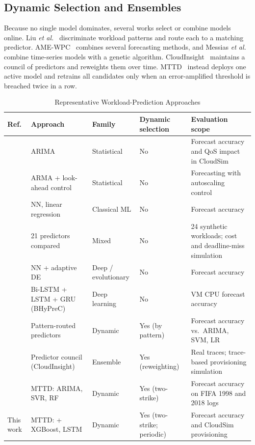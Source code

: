 \documentclass[journal,onecolumn,11pt]{IEEEtran}
\begin{document}
\subsection{Dynamic Selection and Ensembles}
Because no single model dominates, several works select or combine models online. Liu \emph{et al.}~\cite{liu2017} discriminate workload patterns and route each to a matching predictor. AME-WPC~\cite{cetinski2015} combines several forecasting methods, and Messias \emph{et al.}~\cite{messias2016} combine time-series models with a genetic algorithm. CloudInsight~\cite{kim2022} maintains a council of predictors and reweights them over time. MTTD~\cite{nashaat2026} instead deploys one active model and retrains all candidates only when an error-amplified threshold is breached twice in a row.

\begin{table}[H]
\centering
\caption{Representative Workload-Prediction Approaches}
\label{tab:related}
\footnotesize
\begin{tabularx}{\linewidth}{@{}l L l l L@{}}
\toprule
Ref. & Approach & Family & Dynamic selection & Evaluation scope\\
\midrule
\cite{calheiros2015} & ARIMA & Statistical & No & Forecast accuracy and QoS impact in CloudSim\\
\cite{roy2011} & ARMA + look-ahead control & Statistical & No & Forecasting with autoscaling control\\
\cite{islam2012} & NN, linear regression & Classical ML & No & Forecast accuracy\\
\cite{kim2016} & 21 predictors compared & Mixed & No & 24 synthetic workloads; cost and deadline-miss simulation\\
\cite{kumar2018} & NN + adaptive DE & Deep / evolutionary & No & Forecast accuracy\\
\cite{karim2021} & Bi-LSTM + LSTM + GRU (BHyPreC) & Deep learning & No & VM CPU forecast accuracy\\
\cite{liu2017} & Pattern-routed predictors & Dynamic & Yes (by pattern) & Forecast accuracy vs.\ ARIMA, SVM, LR\\
\cite{kim2022} & Predictor council (CloudInsight) & Ensemble & Yes (reweighting) & Real traces; trace-based provisioning simulation\\
\cite{nashaat2026} & MTTD: ARIMA, SVR, RF & Dynamic & Yes (two-strike) & Forecast accuracy on FIFA 1998 and 2018 logs\\
This work & MTTD: + XGBoost, LSTM & Dynamic & Yes (two-strike; periodic) & Forecast accuracy and CloudSim provisioning\\
\bottomrule
\end{tabularx}
\end{table}
\end{document}
